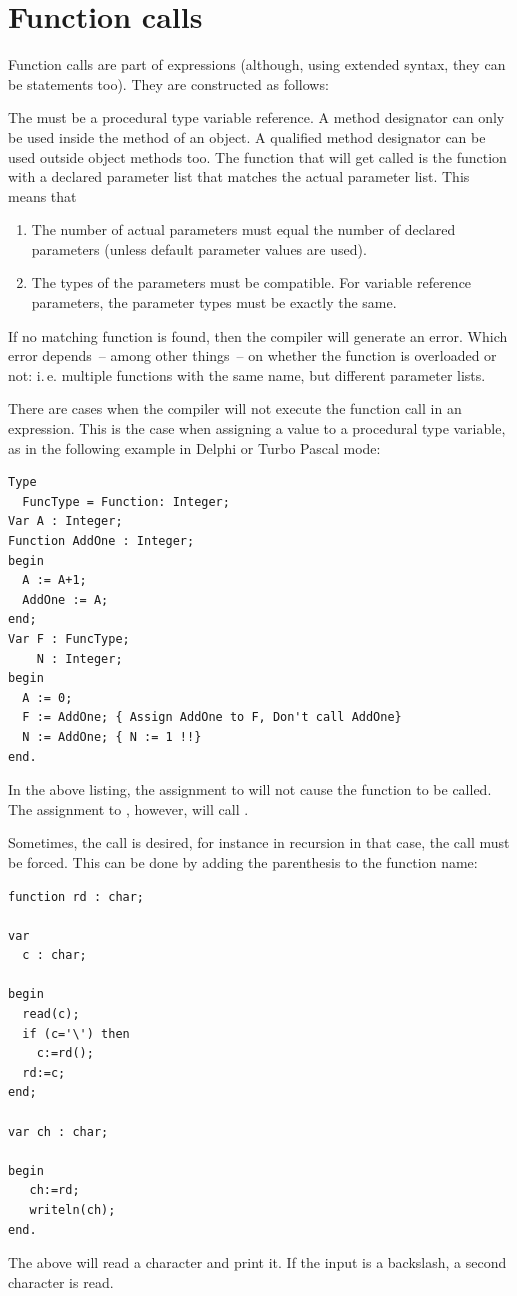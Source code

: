 \section{Function calls}
Function calls are part of expressions (although, using extended syntax,
they can be statements too). They are constructed as follows:

The  must be a procedural type variable reference.
A method designator can only be used inside the method of an object. 
A qualified method designator can be used outside object methods too.
The function that will get called is the function with a declared parameter
list that matches the actual parameter list. This means that
\begin{enumerate}
\item The number of actual parameters must equal the number of declared
parameters (unless default parameter values are used).
\item The types of the parameters must be compatible. For variable
reference parameters, the parameter types must be exactly the same.
\end{enumerate}
If no matching function is found, then the compiler will generate an error.
Which error depends~-- among other things~-- on whether the function is overloaded
or not: i.\,e. multiple functions with the same name, but different parameter
lists.

There are cases when the compiler will not execute the function call in an
expression. This is the case when assigning a value to a procedural
type variable, as in the following example in Delphi or Turbo Pascal mode:
\begin{verbatim}
Type
  FuncType = Function: Integer;
Var A : Integer;
Function AddOne : Integer;
begin
  A := A+1;
  AddOne := A;
end;
Var F : FuncType;
    N : Integer;
begin
  A := 0;
  F := AddOne; { Assign AddOne to F, Don't call AddOne}
  N := AddOne; { N := 1 !!}
end.
\end{verbatim}
In the above listing, the assignment to  will not cause the function
 to be called. The assignment to , however, will call
.

Sometimes, the call is desired, for instance in recursion
in that case, the call must be forced. This can be done by adding the
parenthesis to the function name:
\begin{verbatim}
function rd : char;

var
  c : char;

begin
  read(c);
  if (c='\') then
    c:=rd();
  rd:=c;
end;

var ch : char;

begin
   ch:=rd;
   writeln(ch);
end.
\end{verbatim}
The above will read a character and print it. If the input is a backslash, a
second character is read.

